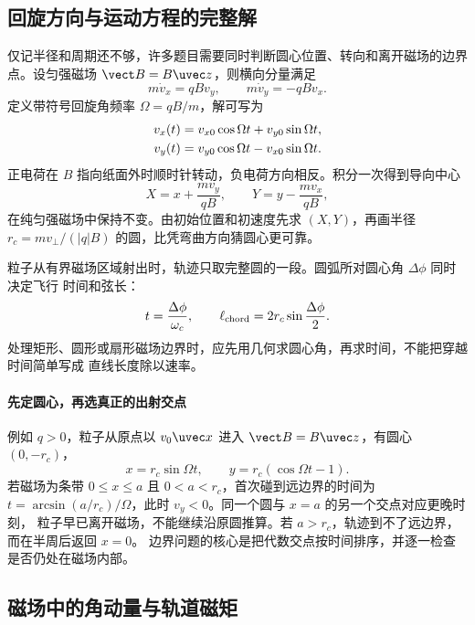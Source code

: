 \subsection*{回旋方向与运动方程的完整解}

仅记半径和周期还不够，许多题目需要同时判断圆心位置、转向和离开磁场的边界点。设匀强磁场
$\vect B=B\uvec z$，则横向分量满足
\begin{equation}
 m\dot v_x=qBv_y,
 \qquad
 m\dot v_y=-qBv_x.
\end{equation}
定义带符号回旋角频率 $\Omega=qB/m$，解可写为
\begin{align}
 v_x(t)&=v_{x0}\cos\Omega t+v_{y0}\sin\Omega t,\notag\\
 v_y(t)&=v_{y0}\cos\Omega t-v_{x0}\sin\Omega t.
\end{align}
正电荷在 $B$ 指向纸面外时顺时针转动，负电荷方向相反。积分一次得到导向中心
\begin{equation}
 X=x+\frac{mv_y}{qB},
 \qquad
 Y=y-\frac{mv_x}{qB},
\end{equation}
在纯匀强磁场中保持不变。由初始位置和初速度先求 $(X,Y)$，再画半径
$r_c=mv_\perp/(|q|B)$ 的圆，比凭弯曲方向猜圆心更可靠。

粒子从有界磁场区域射出时，轨迹只取完整圆的一段。圆弧所对圆心角 $\Delta\phi$ 同时决定飞行
时间和弦长：
\begin{equation}
 t=\frac{\Delta\phi}{\omega_c},
 \qquad
 \ell_{\rm chord}=2r_c\sin\frac{\Delta\phi}{2}.
\end{equation}
处理矩形、圆形或扇形磁场边界时，应先用几何求圆心角，再求时间，不能把穿越时间简单写成
直线长度除以速率。



\paragraph{先定圆心，再选真正的出射交点}
例如 $q>0$，粒子从原点以 $v_0\uvec x$ 进入 $\vect B=B\uvec z$，有圆心 $(0,-r_c)$，
\[
 x=r_c\sin\Omega t,\qquad y=r_c(\cos\Omega t-1).
\]
若磁场为条带 $0\le x\le a$ 且 $0<a<r_c$，首次碰到远边界的时间为
$t=\arcsin(a/r_c)/\Omega$，此时 $v_y<0$。同一个圆与 $x=a$ 的另一个交点对应更晚时刻，
粒子早已离开磁场，不能继续沿原圆推算。若 $a>r_c$，轨迹到不了远边界，而在半周后返回 $x=0$。
边界问题的核心是把代数交点按时间排序，并逐一检查是否仍处在磁场内部。

\subsection*{磁场中的角动量与轨道磁矩}


